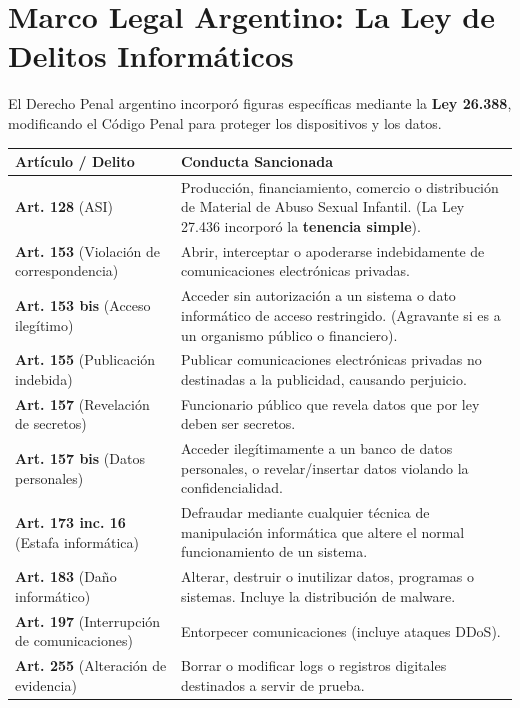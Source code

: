 \documentclass[11pt,a4paper]{article}
\begin{document}
\section{Marco Legal Argentino: La Ley de Delitos Informáticos}
El Derecho Penal argentino incorporó figuras específicas mediante la \textbf{Ley 26.388}, modificando el Código Penal para proteger los dispositivos y los datos.

\begin{ley}
\begin{longtable}{@{} p{4cm} p{10cm} @{}}
\toprule
\textbf{Artículo / Delito} & \textbf{Conducta Sancionada} \\
\midrule
\textbf{Art. 128} (ASI) & Producción, financiamiento, comercio o distribución de Material de Abuso Sexual Infantil. (La Ley 27.436 incorporó la \textbf{tenencia simple}). \\
\midrule
\textbf{Art. 153} (Violación de correspondencia) & Abrir, interceptar o apoderarse indebidamente de comunicaciones electrónicas privadas. \\
\midrule
\textbf{Art. 153 bis} (Acceso ilegítimo) & Acceder sin autorización a un sistema o dato informático de acceso restringido. (Agravante si es a un organismo público o financiero). \\
\midrule
\textbf{Art. 155} (Publicación indebida) & Publicar comunicaciones electrónicas privadas no destinadas a la publicidad, causando perjuicio. \\
\midrule
\textbf{Art. 157} (Revelación de secretos) & Funcionario público que revela datos que por ley deben ser secretos. \\
\midrule
\textbf{Art. 157 bis} (Datos personales) & Acceder ilegítimamente a un banco de datos personales, o revelar/insertar datos violando la confidencialidad. \\
\midrule
\textbf{Art. 173 inc. 16} (Estafa informática) & Defraudar mediante cualquier técnica de manipulación informática que altere el normal funcionamiento de un sistema. \\
\midrule
\textbf{Art. 183} (Daño informático) & Alterar, destruir o inutilizar datos, programas o sistemas. Incluye la distribución de malware. \\
\midrule
\textbf{Art. 197} (Interrupción de comunicaciones) & Entorpecer comunicaciones (incluye ataques DDoS). \\
\midrule
\textbf{Art. 255} (Alteración de evidencia) & Borrar o modificar logs o registros digitales destinados a servir de prueba. \\
\bottomrule
\end{longtable}
\end{ley}
\end{document}
